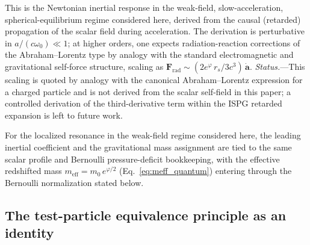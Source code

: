 \documentclass[aps,prd,onecolumn,superscriptaddress,nofootinbib,showpacs,12pt,notitlepage]{revtex4-2}
\begin{document}
This is the Newtonian inertial response in the weak-field,
slow-acceleration, spherical-equilibrium regime considered
here, derived from the causal (retarded) propagation of the
scalar field during acceleration.  The derivation is perturbative in
$a/(c\omega_{0}) \ll 1$; at higher orders, one expects
radiation-reaction corrections of the
Abraham--Lorentz type by analogy with the standard
electromagnetic and gravitational self-force structure,
scaling as $\mathbf{F}_{\mathrm{rad}} \sim
(2e^{\varphi}\,r_{s}/3c^{3})\,\dot{\mathbf{a}}$.
\emph{Status.}---This scaling is quoted by analogy
with the canonical Abraham--Lorentz expression for a
charged particle and is not derived from the scalar
self-field in this paper; a controlled derivation of
the third-derivative term within the ISPG retarded
expansion is left to future work.

For the localized resonance in the weak-field regime considered here,
the leading inertial coefficient and the gravitational mass
assignment are tied to the same scalar profile and Bernoulli
pressure-deficit bookkeeping, with the effective redshifted mass
$m_{\mathrm{eff}}=m_{0}\,e^{\varphi/2}$
(Eq.~\ref{eq:meff_quantum}) entering through the
Bernoulli normalization stated below.

\subsection{The test-particle equivalence principle as an identity}
\label{sec:equivalence}
\end{document}
